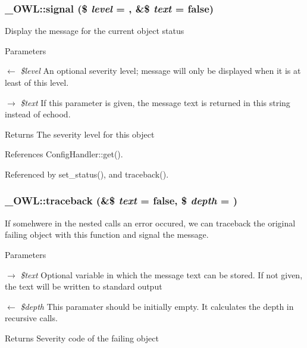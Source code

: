 \subsubsection[{signal}]{\setlength{\rightskip}{0pt plus 5cm}\_\-OWL::signal (\$ {\em level} = {}, \/  \&\$ {\em text} = {\ttfamily false})}\label{class__OWL_a51ba4a16409acf2a2f61f286939091a5}
Display the message for the current object status


\begin{DoxyParams}{Parameters}
\item[\mbox{$\leftarrow$} {\em \$level}]An optional severity level; message will only be displayed when it is at least of this level. \item[\mbox{$\rightarrow$} {\em \$text}]If this parameter is given, the message text is returned in this string instead of echood. \end{DoxyParams}
\begin{DoxyReturn}{Returns}
The severity level for this object 
\end{DoxyReturn}


References ConfigHandler::get().



Referenced by set\_\-status(), and traceback().

\subsubsection[{traceback}]{\setlength{\rightskip}{0pt plus 5cm}\_\-OWL::traceback (\&\$ {\em text} = {\ttfamily false}, \/  \$ {\em depth} = {})}\label{class__OWL_aa29547995d6741b7d2b90c1d4ea99a13}
If somehwere in the nested calls an error occured, we can traceback the original failing object with this function and signal the message.


\begin{DoxyParams}{Parameters}
\item[\mbox{$\rightarrow$} {\em \$text}]Optional variable in which the message text can be stored. If not given, the text will be written to standard output \item[\mbox{$\leftarrow$} {\em \$depth}]This paramater should be initially empty. It calculates the depth in recursive calls. \end{DoxyParams}
\begin{DoxyReturn}{Returns}
Severity code of the failing object 
\end{DoxyReturn}


